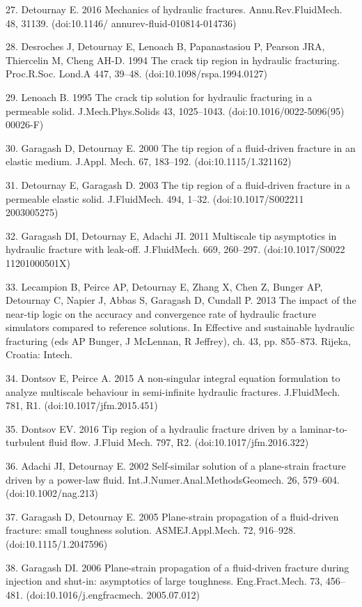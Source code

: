 \documentclass[main.tex]{subfiles}
\begin{document}
27. Detournay E. 2016 Mechanics of hydraulic fractures. Annu.Rev.FluidMech. 48, 31139. (doi:10.1146/ annurev-fluid-010814-014736)

28. Desroches J, Detournay E, Lenoach B, Papanastasiou P, Pearson JRA, Thiercelin M, Cheng AH-D. 1994 The crack tip region in hydraulic fracturing. Proc.R.Soc. Lond.A 447, 39–48. (doi:10.1098/rspa.1994.0127)

29. Lenoach B. 1995 The crack tip solution for hydraulic fracturing in a permeable solid. J.Mech.Phys.Solids 43, 1025–1043. (doi:10.1016/0022-5096(95) 00026-F)

30. Garagash D, Detournay E. 2000 The tip region of a fluid-driven fracture in an elastic medium. J.Appl. Mech. 67, 183–192. (doi:10.1115/1.321162)

31. Detournay E, Garagash D. 2003 The tip region of a fluid-driven fracture in a permeable elastic solid. J.FluidMech. 494, 1–32. (doi:10.1017/S002211 2003005275)

32. Garagash DI, Detournay E, Adachi JI. 2011 Multiscale tip asymptotics in hydraulic fracture with leak-off. J.FluidMech. 669, 260–297. (doi:10.1017/S0022 11201000501X)

33. Lecampion B, Peirce AP, Detournay E, Zhang X, Chen Z, Bunger AP, Detournay C, Napier J, Abbas S, Garagash D, Cundall P. 2013 The impact of the near-tip logic on the accuracy and convergence rate of hydraulic fracture simulators compared to reference solutions. In Effective and sustainable hydraulic fracturing (eds AP Bunger, J McLennan, R Jeffrey), ch. 43, pp. 855–873. Rijeka, Croatia: Intech.

34. Dontsov E, Peirce A. 2015 A non-singular integral equation formulation to analyze multiscale behaviour in semi-infinite hydraulic fractures. J.FluidMech. 781, R1. (doi:10.1017/jfm.2015.451)

35. Dontsov EV. 2016 Tip region of a hydraulic fracture driven by a laminar-to-turbulent fluid flow. J.Fluid Mech. 797, R2. (doi:10.1017/jfm.2016.322)

36. Adachi JI, Detournay E. 2002 Self-similar solution of a plane-strain fracture driven by a power-law fluid. Int.J.Numer.Anal.MethodsGeomech. 26, 579–604. (doi:10.1002/nag.213)

37. Garagash D, Detournay E. 2005 Plane-strain propagation of a fluid-driven fracture: small toughness solution. ASMEJ.Appl.Mech. 72, 916–928. (doi:10.1115/1.2047596)

38. Garagash DI. 2006 Plane-strain propagation of a fluid-driven fracture during injection and shut-in: asymptotics of large toughness. Eng.Fract.Mech. 73, 456–481. (doi:10.1016/j.engfracmech. 2005.07.012)
\end{document}
